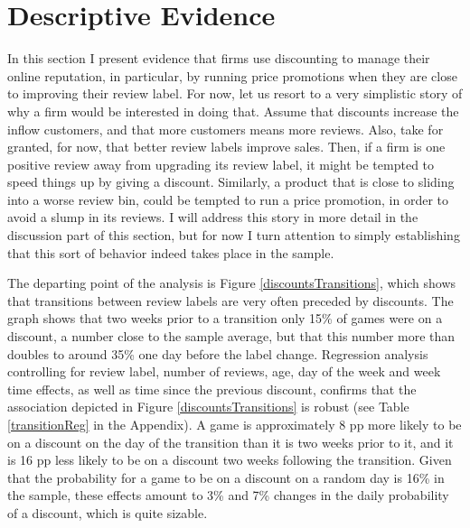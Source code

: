 \documentclass[12pt,pagebackref]{article}
\begin{document}
\hypertarget{descriptive-evidence}{%
\section{Descriptive Evidence}\label{descriptive-evidence}}

In this section I present evidence that firms use discounting to manage
their online reputation, in particular, by running price promotions when
they are close to improving their review label. For now, let us resort
to a very simplistic story of why a firm would be interested in doing
that. Assume that discounts increase the inflow customers, and that more
customers means more reviews. Also, take for granted, for now, that
better review labels improve sales. Then, if a firm is one positive
review away from upgrading its review label, it might be tempted to
speed things up by giving a discount. Similarly, a product that is close
to sliding into a worse review bin, could be tempted to run a price
promotion, in order to avoid a slump in its reviews. I will address this
story in more detail in the discussion part of this section, but for now
I turn attention to simply establishing that this sort of behavior
indeed takes place in the sample.

The departing point of the analysis is Figure
\ref{discountsTransitions}, which shows that transitions between review
labels are very often preceded by discounts. The graph shows that two
weeks prior to a transition only 15\% of games were on a discount, a
number close to the sample average, but that this number more than
doubles to around 35\% one day before the label change. Regression
analysis controlling for review label, number of reviews, age, day of
the week and week time effects, as well as time since the previous
discount, confirms that the association depicted in Figure
\ref{discountsTransitions} is robust (see Table \ref{transitionReg} in
the Appendix). A game is approximately 8 pp more likely to be on a
discount on the day of the transition than it is two weeks prior to it,
and it is 16 pp less likely to be on a discount two weeks following the
transition. Given that the probability for a game to be on a discount on
a random day is 16\% in the sample, these effects amount to 3\% and 7\%
changes in the daily probability of a discount, which is quite sizable.
\end{document}
